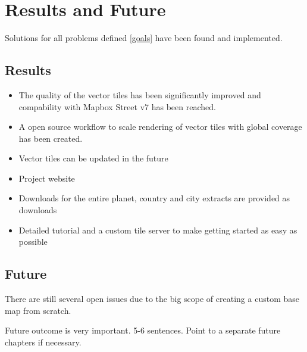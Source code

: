 \chapter{Results and Future}\label{part1_results_and_future}

Solutions for all problems defined \autoref{goals} have been found and implemented.

\section{Results}\label{part1_results}

\begin{itemize}
    \item The quality of the vector tiles has been significantly improved and compability with Mapbox Street v7 has been reached.
    \item A open source workflow to scale rendering of vector tiles with global coverage has been created.
    \item Vector tiles can be updated in the future
    \item Project website 
    \item Downloads for the entire planet, country and city extracts are provided as downloads
    \item Detailed tutorial and a custom tile server to make getting started as easy as possible
\end{itemize}

\section{Future}\label{part1_future}

There are still several open issues due to the big scope of creating a custom base map from scratch.


Future outcome is very important.
5-6 sentences. Point to a separate future chapters if necessary.
